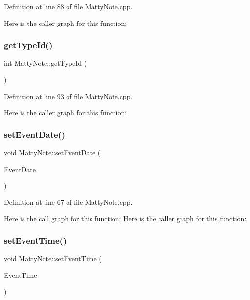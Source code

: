 Definition at line 88 of file Matty\+Note.\+cpp.

Here is the caller graph for this function\+:
\hypertarget{classMattyNote_af5b90028a8e406e41b8c8a6de83685ef}{}\label{classMattyNote_af5b90028a8e406e41b8c8a6de83685ef} 
\subsubsection{\texorpdfstring{get\+Type\+Id()}{getTypeId()}}
{\footnotesize\ttfamily int Matty\+Note\+::get\+Type\+Id (\begin{DoxyParamCaption}{ }\end{DoxyParamCaption})}



Definition at line 93 of file Matty\+Note.\+cpp.

Here is the caller graph for this function\+:
\hypertarget{classMattyNote_a70676b1ab215b873c9451a82cc417684}{}\label{classMattyNote_a70676b1ab215b873c9451a82cc417684} 
\subsubsection{\texorpdfstring{set\+Event\+Date()}{setEventDate()}}
{\footnotesize\ttfamily void Matty\+Note\+::set\+Event\+Date (\begin{DoxyParamCaption}\item[{const Q\+String \&}]{Event\+Date }\end{DoxyParamCaption})}



Definition at line 67 of file Matty\+Note.\+cpp.

Here is the call graph for this function\+:
Here is the caller graph for this function\+:
\hypertarget{classMattyNote_aaeba8670420ab9ad0fb8be660845e0ba}{}\label{classMattyNote_aaeba8670420ab9ad0fb8be660845e0ba} 
\subsubsection{\texorpdfstring{set\+Event\+Time()}{setEventTime()}}
{\footnotesize\ttfamily void Matty\+Note\+::set\+Event\+Time (\begin{DoxyParamCaption}\item[{const Q\+String \&}]{Event\+Time }\end{DoxyParamCaption})}



